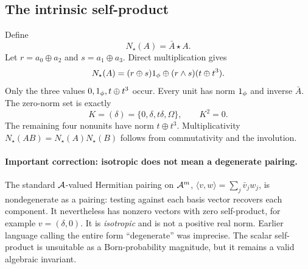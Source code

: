 \subsection{The intrinsic self-product}
Define
\begin{equation}
 N_\star(A)=\bar A\star A.
\end{equation}
Let $r=a_0\oplus a_2$ and $s=a_1\oplus a_3$. Direct multiplication gives
\begin{equation}\label{eq:normformula}
 N_\star(A)=(r\oplus s)1_{\phi}\oplus (r\land s)(t\oplus t^3).
\end{equation}
Only the three values $0,1_{\phi},t\oplus t^3$ occur. Every unit has norm $1_{\phi}$ and inverse $\bar A$. The zero-norm set is exactly
\begin{equation}\label{eq:K}
 K=(\delta)=\{0,\delta,t\delta,\Omega\},\qquad K^2=0.
\end{equation}
The remaining four nonunits have norm $t\oplus t^3$. Multiplicativity $N_\star(AB)=N_\star(A)N_\star(B)$ follows from commutativity and the involution.

\paragraph{Important correction: isotropic does not mean a degenerate pairing.}
The standard $\mathcal A$-valued Hermitian pairing on $\mathcal A^m$,
$\langle v,w\rangle=\sum_j\bar v_jw_j$, is nondegenerate as a pairing: testing against each basis vector recovers each component. It nevertheless has nonzero vectors with zero self-product, for example $v=(\delta,0)$. It is \emph{isotropic} and is not a positive real norm. Earlier language calling the entire form ``degenerate'' was imprecise. The scalar self-product is unsuitable as a Born-probability magnitude, but it remains a valid algebraic invariant.

